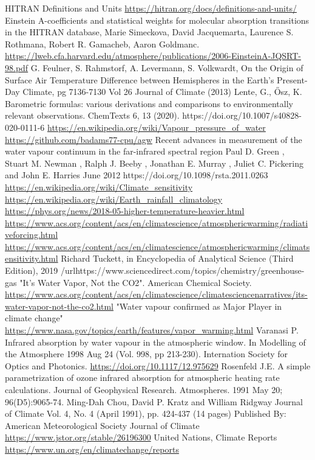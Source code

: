 \documentclass{book}
\begin{document}
\begin{thebibliography}{99}
		 HITRAN Definitions and Units \url{https://hitran.org/docs/definitions-and-units/}
		 Einstein A-coefficients and statistical weights for molecular
		absorption transitions in the HITRAN database, Marie Simeckova, David Jacquemarta, Laurence S. Rothmana,
		Robert R. Gamacheb, Aaron Goldmanc. \url{https://lweb.cfa.harvard.edu/atmosphere/publications/2006-EinsteinA-JQSRT-98.pdf}
		 G. Feulner, S. Rahmstorf, A. Levermann, S. Volkwardt, On the Origin of Surface Air Temperature Difference between Hemispheres in the Earth's Present-Day Climate,
		pg 7136-7130 Vol 26 Journal of Climate (2013)
		 Lente, G., Ősz, K. Barometric formulas: various derivations and comparisons to environmentally relevant observations. ChemTexts 6, 13 (2020). https://doi.org/10.1007/s40828-020-0111-6
		 \url{https://en.wikipedia.org/wiki/Vapour_pressure_of_water}
		 \url{https://github.com/badams77-cpu/agw}
		 Recent advances in measurement of the water vapour continuum in the far-infrared spectral region
		Paul D. Green
		, Stuart M. Newman
		, Ralph J. Beeby
		, Jonathan E. Murray
		, Juliet C. Pickering
		and John E. Harries
		June 2012 https://doi.org/10.1098/rsta.2011.0263
			\url{https://en.wikipedia.org/wiki/Climate_sensitivity}
		 \url{https://en.wikipedia.org/wiki/Earth_rainfall_climatology}
		 \url{https://phys.org/news/2018-05-higher-temperature-heavier.html}
		 \url{https://www.acs.org/content/acs/en/climatescience/atmosphericwarming/radiativeforcing.html}
		 \url{https://www.acs.org/content/acs/en/climatescience/atmosphericwarming/climatsensitivity.html}
		 Richard Tuckett, in Encyclopedia of Analytical Science (Third Edition), 2019 /url{https://www.sciencedirect.com/topics/chemistry/greenhouse-gas}
		  "It's Water Vapor, Not the CO2". American Chemical Society. \url{https://www.acs.org/content/acs/en/climatescience/climatesciencenarratives/its-water-vapor-not-the-co2.html}
		  "Water vapour confirmed as Major Player in climate change" \url{https://www.nasa.gov/topics/earth/features/vapor_warming.html}
		 Varanasi P. Infrared absorption by water vapour in the atmospheric window. In Modelling of the Atmosphere 1998 Aug 24 (Vol. 998, pp 213-230). Internation Society for Optics and Photonics.
		\url{https://doi.org/10.1117/12.975629}
		 Rosenfeld J.E. A simple parametrization of ozone infrared absorption for atmospheric heating rate calculations. Journal of Geophysical Research. Atmospheres. 1991 May 20; 96(D5):9065-74.
		  Ming-Dah Chou, David P. Kratz and William Ridgway 
		Journal of Climate
		Vol. 4, No. 4 (April 1991), pp. 424-437 (14 pages)
		Published By: American Meteorological Society
		Journal of Climate    \url{https://www.jstor.org/stable/26196300}
		 United Nations, Climate Reports \url{https://www.un.org/en/climatechange/reports}
	\end{thebibliography}
	
\end{document}
